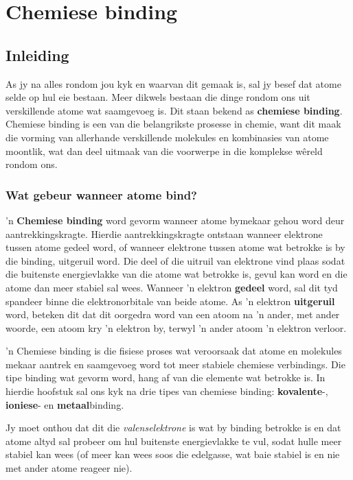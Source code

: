          \chapter{Chemiese binding}
    \setcounter{figure}{1}
    \setcounter{subfigure}{1}
    \label{m38704*cid1}
            \section{Inleiding}
            \nopagebreak

As jy na alles rondom jou kyk en waarvan dit gemaak is, sal jy besef dat atome selde op hul  eie bestaan. Meer dikwels bestaan die dinge rondom ons ​​uit verskillende atome wat saamgevoeg is. Dit staan bekend as \textbf{chemiese binding}. Chemiese binding is een van die belangrikste prosesse in chemie, want dit maak die vorming van allerhande verskillende molekules en kombinasies van atome moontlik, wat dan deel uitmaak van die voorwerpe in die komplekse w\^{e}reld rondom ons. \par 
{}
    \label{m38704*cid4}
            \subsection*{Wat gebeur wanneer atome bind?}
            \nopagebreak
      \label{m38704*id138842} 'n \textbf{Chemiese binding} word gevorm wanneer atome bymekaar gehou word deur aantrekkingskragte. Hier\-die aantrekkingskragte ontstaan wanneer elektrone tussen atome gedeel word, of wanneer elektrone tussen atome wat betrokke is by die binding, uitgeruil word. Die deel of die uitruil van elektrone vind plaas sodat die buitenste energievlakke van die atome wat betrokke is, gevul kan word en die atome dan meer stabiel sal wees. Wanneer 'n elektron \textbf{gedeel} word, sal dit tyd spandeer binne die elektronorbitale van beide atome. As 'n elektron \textbf{uitgeruil} word, beteken dit dat dit oorgedra word van een atoom na 'n ander, met ander woorde, een atoom kry 'n elektron by, terwyl  'n ander atoom  'n elektron verloor.\par 
\label{m38704*fhsst!!!underscore!!!id83}
 { 'n Chemiese binding is die fisiese proses wat veroorsaak dat atome en molekules mekaar aantrek en saamgevoeg word tot meer stabiele chemiese verbindings.} 
      \label{m38704*id138909}Die tipe binding wat gevorm word, hang af van die elemente wat betrokke is. In hierdie hoofstuk
sal ons kyk na drie tipes van chemiese binding: \textbf{kovalente}-, \textbf{ioniese}- en \textbf{metaal}binding.\par 
      \label{m38704*id138929}
Jy moet onthou dat dit die \textsl{valenselektrone} is wat by binding betrokke is en dat atome altyd sal probeer om hul buitenste energievlakke te vul, sodat hulle meer stabiel kan wees (of meer kan wees soos die edelgasse, wat baie stabiel is en nie met ander atome reageer nie).\par 
 
